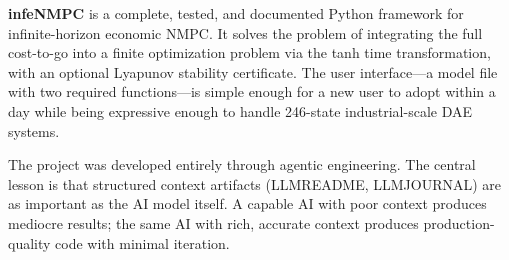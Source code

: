 \documentclass[11pt,letterpaper]{article}
\begin{document}
\textbf{infeNMPC} is a complete, tested, and documented Python framework for infinite-horizon economic NMPC. It solves the problem of integrating the full cost-to-go into a finite optimization problem via the tanh time transformation, with an optional Lyapunov stability certificate. The user interface---a model file with two required functions---is simple enough for a new user to adopt within a day while being expressive enough to handle 246-state industrial-scale DAE systems.

The project was developed entirely through agentic engineering. The central lesson is that structured context artifacts (LLMREADME, LLMJOURNAL) are as important as the AI model itself. A capable AI with poor context produces mediocre results; the same AI with rich, accurate context produces production-quality code with minimal iteration.
\end{document}
